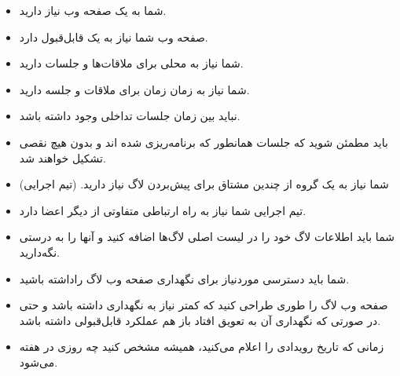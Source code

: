 \begin{itemize}
\item
شما به یک صفحه وب نیاز دارید.
\item
صفحه وب شما نیاز به یک  قابل‌قبول دارد.
\item
شما نیاز به محلی برای ملاقات‌ها و جلسات دارید.
\item
شما نیاز به زمان زمان برای ملاقات و جلسه دارید.
\item
نباید بین زمان جلسات تداخلی وجود داشته باشد.
\item
باید مطمئن شوید که جلسات همانطور که برنامه‌ریزی شده اند و بدون هیچ نقصی تشکیل خواهند شد.
\item
شما نیاز به یک گروه از چندین مشتاق برای پیش‌بردن لاگ نیاز دارید. (تیم اجرایی)
\item
تیم اجرایی شما نیاز به راه ارتباطی متفاوتی از دیگر اعضا دارد.
\item
شما باید اطلاعات لاگ خود را در لیست اصلی لاگ‌ها اضافه کنید و آنها را به درستی نگه‌دارید.
\item
شما باید دسترسی موردنیاز برای نگهداری صفحه وب لاگ راداشته باشید.
\item
صفحه وب لاگ را طوری طراحی کنید که کمتر نیاز به نگهداری داشته باشد و حتی در صورتی که
نگهداری آن به تعویق افتاد باز هم عملکرد قابل‌قبولی داشته باشد.
\item
زمانی که تاریخ رویدادی را اعلام می‌کنید، همیشه مشخص کنید چه روزی در هفته می‌شود.

\end{itemize}
